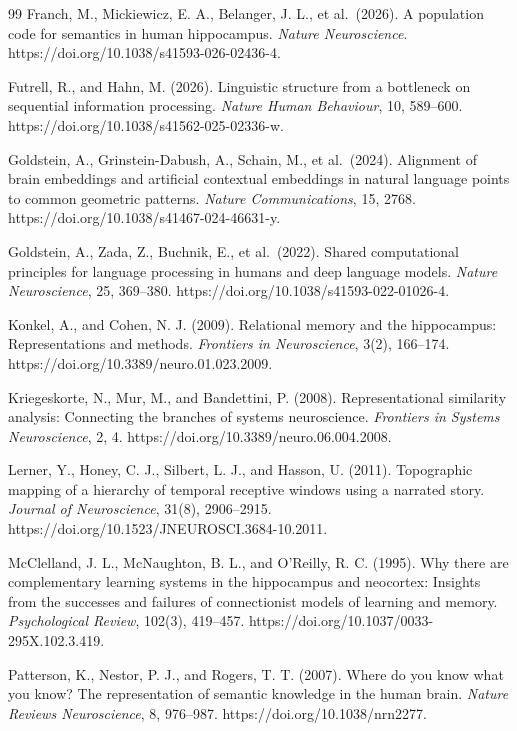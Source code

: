 \documentclass[11pt]{article}
\begin{document}
\begin{thebibliography}{99}
Franch, M., Mickiewicz, E. A., Belanger, J. L., et al.~(2026). A
population code for semantics in human hippocampus. \emph{Nature
Neuroscience}. https://doi.org/10.1038/s41593-026-02436-4.

Futrell, R., and Hahn, M. (2026). Linguistic structure from a bottleneck
on sequential information processing. \emph{Nature Human Behaviour}, 10,
589--600. https://doi.org/10.1038/s41562-025-02336-w.

Goldstein, A., Grinstein-Dabush, A., Schain, M., et al.~(2024).
Alignment of brain embeddings and artificial contextual embeddings in
natural language points to common geometric patterns. \emph{Nature
Communications}, 15, 2768. https://doi.org/10.1038/s41467-024-46631-y.

Goldstein, A., Zada, Z., Buchnik, E., et al.~(2022). Shared
computational principles for language processing in humans and deep
language models. \emph{Nature Neuroscience}, 25, 369--380.
https://doi.org/10.1038/s41593-022-01026-4.

Konkel, A., and Cohen, N. J. (2009). Relational memory and the
hippocampus: Representations and methods. \emph{Frontiers in
Neuroscience}, 3(2), 166--174.
https://doi.org/10.3389/neuro.01.023.2009.

Kriegeskorte, N., Mur, M., and Bandettini, P. (2008). Representational
similarity analysis: Connecting the branches of systems neuroscience.
\emph{Frontiers in Systems Neuroscience}, 2, 4.
https://doi.org/10.3389/neuro.06.004.2008.

Lerner, Y., Honey, C. J., Silbert, L. J., and Hasson, U. (2011).
Topographic mapping of a hierarchy of temporal receptive windows using a
narrated story. \emph{Journal of Neuroscience}, 31(8), 2906--2915.
https://doi.org/10.1523/JNEUROSCI.3684-10.2011.

McClelland, J. L., McNaughton, B. L., and O'Reilly, R. C. (1995). Why
there are complementary learning systems in the hippocampus and
neocortex: Insights from the successes and failures of connectionist
models of learning and memory. \emph{Psychological Review}, 102(3),
419--457. https://doi.org/10.1037/0033-295X.102.3.419.

Patterson, K., Nestor, P. J., and Rogers, T. T. (2007). Where do you
know what you know? The representation of semantic knowledge in the
human brain. \emph{Nature Reviews Neuroscience}, 8, 976--987.
https://doi.org/10.1038/nrn2277.


\end{thebibliography}
\end{document}
